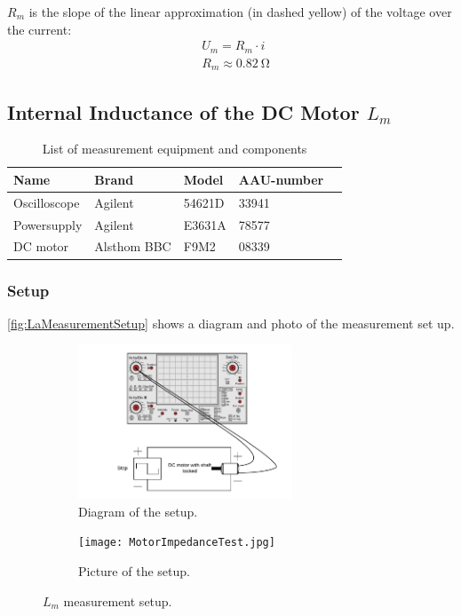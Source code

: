 $R_m$ is the slope of the linear approximation (in dashed yellow) of the voltage over the current: 
\begin{subequations} \label{eq:LaEq}
	\begin{flalign}
		&U_m = R_m \cdot i \\
		&R_m \approx \SI{0.82}{\ohm}
	\end{flalign}
\end{subequations}


\subsection{Internal Inductance of the DC Motor $L_m$}
\begin{table}[htbp]
	\centering
	\caption{List of measurement equipment and components}\label{tab_appendix:LaSetUp}

	\begin{tabularx}{\textwidth}{lXXXX}
		Name 				& Brand	& Model & AAU-number									\\ \toprule \rowcolor{lightGrey}
		Oscilloscope	& Agilent & 54621D & 33941 	\\
		Powersupply	& Agilent & E3631A & 78577\\ \rowcolor{lightGrey}
		DC motor & Alsthom BBC & F9M2& 08339 
	\end{tabularx}
\end{table}
\subsubsection*{Setup}
\autoref{fig:LaMeasurementSetup} shows a diagram and photo of the measurement set up.
\begin{figure}[htbp]
	\centering
	\begin{subfigure}{0.50\textwidth}
		\includegraphics[width=0.7\textwidth]{figures/appendix/Motor&GearTests/LmDiagram}
		\caption{Diagram of the setup.} \label{fig:LaMeasurementDiagram}
	\end{subfigure}
	\begin{subfigure}{0.40\textwidth}
		\texttt{[image: MotorImpedanceTest.jpg]}
		\caption{Picture of the setup.} \label{fig:LaMeasurementPictures}
	\end{subfigure}
	\caption{$L_m$ measurement setup.} \label{fig:LaMeasurementSetup}   
\end{figure}

